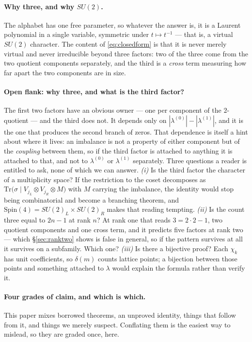 \documentclass[11pt,a4paper]{article}
\begin{document}
\paragraph{Why three, and why $SU(2)$.} The alphabet has one free parameter, so whatever the
answer is, it is a Laurent polynomial in a single variable, symmetric under $t\mapsto t^{-1}$
--- that is, a virtual $SU(2)$ character. The content of \eqref{eq:closedform} is that it is
never merely virtual and never irreducible beyond three factors: two of the three come from the
two quotient components separately, and the third is a \emph{cross} term measuring how far
apart the two components are in size.

\paragraph{Open flank: why three, and what is the third factor?} The first two factors have an
obvious owner --- one per component of the $2$-quotient --- and the third does not. It depends
only on $|\lambda^{(0)}|-|\lambda^{(1)}|$, and it is the one that produces the second branch of
zeros. That dependence is itself a hint about where it lives: an imbalance is not a property of
either component but of the \emph{coupling} between them, so if the third factor is attached to
anything it is attached to that, and not to $\lambda^{(0)}$ or $\lambda^{(1)}$ separately. Three questions a reader is entitled to ask, none of which we can answer.
\emph{(i)} Is the third factor the character of a multiplicity space? If the restriction to the
coset decomposes as $\mathrm{Tr}\big(\sigma\mid V_{j_L}\otimes V_{j_R}\otimes M\big)$ with $M$
carrying the imbalance, the identity would stop being combinatorial and become a branching
theorem, and $\mathrm{Spin}(4)=SU(2)_L\times SU(2)_R$ makes that reading tempting.
\emph{(ii)} Is the count three equal to $2n-1$ at rank $n$? At rank one that reads
$3=2\cdot2-1$, two quotient components and one cross term, and it predicts five factors at rank
two --- which \S\ref{sec:ranktwo} shows is false in general, so if the pattern survives at all
it survives on a subfamily. Which one?
\emph{(iii)} Is there a bijective proof? Each $\chi_k$ has unit coefficients, so $\delta(m)$
counts lattice points; a bijection between those points and something attached to $\lambda$
would explain the formula rather than verify it.

\paragraph{Four grades of claim, and which is which.} This paper mixes borrowed theorems, an
unproved identity, things that follow from it, and things we merely suspect. Conflating them is
the easiest way to mislead, so they are graded once, here.
\end{document}
